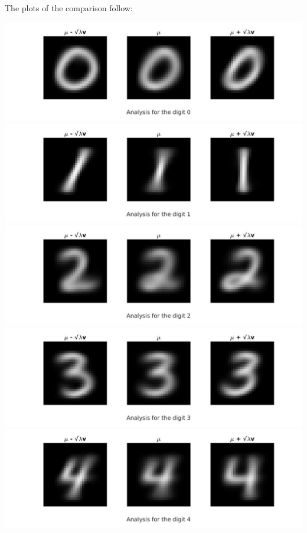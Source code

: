 \documentclass[12pt, a4paper]{article}
\begin{document}
 \noindent The plots of the comparison follow:
 
\includegraphics[width=\textwidth, height = 0.25\paperheight]{Comparison_mu_0}
\includegraphics[width=\textwidth, height = 0.25\paperheight]{Comparison_mu_1}
\includegraphics[width=\textwidth, height = 0.25\paperheight]{Comparison_mu_2}
\includegraphics[width=\textwidth, height = 0.25\paperheight]{Comparison_mu_3}
\includegraphics[width=\textwidth, height = 0.25\paperheight]{Comparison_mu_4}
\end{document}
